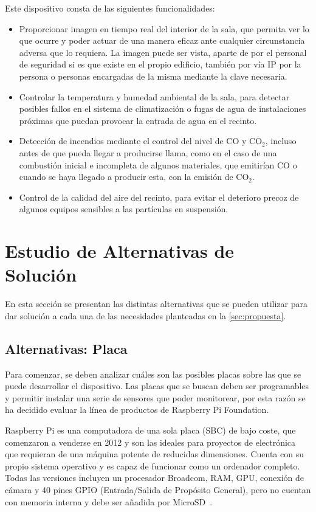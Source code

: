 Este dispositivo consta de las siguientes funcionalidades:
\begin{itemize}
	\item Proporcionar imagen en tiempo real del interior de la sala, que permita ver lo que ocurre y poder actuar de una manera eficaz ante cualquier circunstancia adversa que lo requiera. La imagen puede ser vista, aparte de por el personal de seguridad si es que existe en el propio edificio, también por vía IP por la persona o personas encargadas de la misma mediante la clave necesaria.
	\item Controlar la temperatura y humedad ambiental de la sala, para detectar posibles fallos en el sistema de climatización o fugas de agua de instalaciones próximas que puedan provocar la entrada de agua en el recinto.
	\item Detección de incendios mediante el control del nivel de CO y CO$_2$, incluso antes de que pueda llegar a producirse llama, como en el caso de una combustión inicial e incompleta de algunos materiales, que emitirían CO o cuando se haya llegado a producir esta, con la emisión de CO$_2$.
	\item Control de la calidad del aire del recinto, para evitar el deterioro precoz de algunos equipos sensibles a las partículas en suspensión.
\end{itemize}

\section{Estudio de Alternativas de Solución}\label{sec:estudio-de-alternativas-de-solución}
En esta sección se presentan las distintas alternativas que se pueden utilizar para dar solución a cada una de las necesidades planteadas en la \autoref{sec:propuesta}.

\subsection{Alternativas: Placa}\label{subsec:altPlacas}
Para comenzar, se deben analizar cuáles son las posibles placas sobre las que  se puede desarrollar el dispositivo. Las placas que se buscan deben ser programables y permitir instalar una serie de sensores que poder monitorear, por esta razón se ha decidido evaluar la línea de productos de Raspberry Pi Foundation.

\begin{figure}[H]
	{\def\svgwidth{.21\textwidth}
		}\label{fig:logoRaspberry}
\end{figure}
Raspberry Pi es una computadora de una sola placa (SBC) de bajo coste, que comenzaron a venderse en 2012 y son las ideales para proyectos de electrónica que requieran de una máquina potente de reducidas dimensiones. Cuenta con su propio sistema operativo y es capaz de funcionar como un ordenador completo. Todas las versiones incluyen un procesador Broadcom, RAM, GPU, conexión de cámara y 40 pines GPIO (Entrada/Salida de Propósito General), pero no cuentan con memoria interna y debe ser añadida por MicroSD~\cite{noauthor_raspberry_2021}.
\pagebreak

